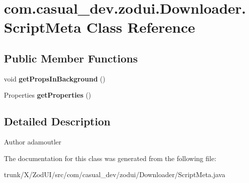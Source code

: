 \hypertarget{classcom_1_1casual__dev_1_1zodui_1_1_downloader_1_1_script_meta}{\section{com.\-casual\-\_\-dev.\-zodui.\-Downloader.\-Script\-Meta Class Reference}
\label{classcom_1_1casual__dev_1_1zodui_1_1_downloader_1_1_script_meta}
}
\subsection*{Public Member Functions}
\begin{DoxyCompactItemize}
\item 
\hypertarget{classcom_1_1casual__dev_1_1zodui_1_1_downloader_1_1_script_meta_a6239dbb4f577f5b350d42b59df8023be}{void {\bfseries get\-Props\-In\-Background} ()}\label{classcom_1_1casual__dev_1_1zodui_1_1_downloader_1_1_script_meta_a6239dbb4f577f5b350d42b59df8023be}

\item 
\hypertarget{classcom_1_1casual__dev_1_1zodui_1_1_downloader_1_1_script_meta_a54b0efabda58d0416ac5b4feb8d24281}{Properties {\bfseries get\-Properties} ()}\label{classcom_1_1casual__dev_1_1zodui_1_1_downloader_1_1_script_meta_a54b0efabda58d0416ac5b4feb8d24281}

\end{DoxyCompactItemize}


\subsection{Detailed Description}
\begin{DoxyAuthor}{Author}
adamoutler 
\end{DoxyAuthor}


The documentation for this class was generated from the following file\-:\begin{DoxyCompactItemize}
\item 
trunk/\-X/\-Zod\-U\-I/src/com/casual\-\_\-dev/zodui/\-Downloader/Script\-Meta.\-java\end{DoxyCompactItemize}
